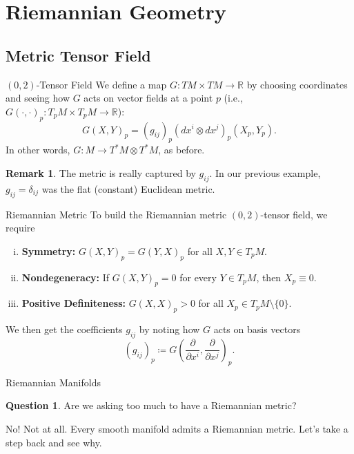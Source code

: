 \documentclass[usenames,dvipsnames]{beamer}
\theoremstyle{definition}
\newtheorem*{remark}{Remark}
\newtheorem*{question}{Question}
\theoremstyle{theorem}
\newcommand{\R}{\mathbb{R}}
\begin{document}
\section{Riemannian Geometry}
    \subsection{Metric Tensor Field}
	    \begin{frame}{$(0,2)$-Tensor Field}
            We define a map $G \colon TM \times TM \to \R$ by choosing coordinates and seeing how $G$ acts on vector fields at a point $p$ (i.e., $G(\cdot,\cdot)_p\colon T_pM\times T_pM \to \R$):
            \[
            G\left(X,Y \right)_p = (g_{ij})_p(dx^i \otimes dx^j)_p(X_p, Y_p).
            \]
            In other words, $G\colon M \to T^*M \otimes T^*M$, as before.
            \begin{remark}
                The metric is really captured by $g_{ij}$. In our previous example, $g_{ij}=\delta_{ij}$ was the flat (constant) Euclidean metric.
            \end{remark}
	    \end{frame}
	    
	    \begin{frame}{Riemannian Metric}
	        To build the Riemannian metric $(0,2)$-tensor field, we require
	        \begin{enumerate}[(i)]
	            \item \textbf{Symmetry:} $G(X,Y)_p=G(Y,X)_p$ for all $X,Y \in T_pM$.
	            \item \textbf{Nondegeneracy:} If $G(X,Y)_p=0$ for every $Y\in T_pM$, then $X_p\equiv 0$.
	            \item \textbf{Positive Definiteness:} $G(X,X)_p>0$ for all $X_p \in T_pM\setminus \{0\}$.
	        \end{enumerate}
	        We then get the coefficients $g_{ij}$ by noting how $G$ acts on basis vectors
	        \[
	        (g_{ij})_p\coloneqq G\left(\frac{\partial}{\partial x^i},\frac{\partial}{\partial x^j}\right)_p.
	        \]
	    \end{frame}
	    
	    \begin{frame}{Riemannian Manifolds}
	        \begin{question}
	        Are we asking too much to have a Riemannian metric?
	        \end{question}
	        \vspace*{0.5cm}
	        No! Not at all. Every smooth manifold admits a Riemannian metric. Let's take a step back and see why.
	    \end{frame}
	    
\end{document}
